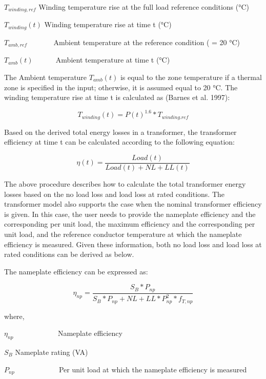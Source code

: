 \({T_{winding,ref}}\) Winding temperature rise at the full load reference conditions (°C)

\({T_{winding}}(t)\) Winding temperature rise at time t (°C)

\({T_{amb,ref}}\) ~~~~~~ Ambient temperature at the reference condition ( = 20 °C)

\({T_{amb}}(t)\) ~~~~~ Ambient temperature at time t (°C)

The Ambient temperature \({T_{amb}}(t)\) is equal to the zone temperature if a thermal zone is specified in the input; otherwise, it is assumed equal to 20 °C. The winding temperature rise at time t is calculated as (Barnes et al. 1997):

\begin{equation}
{T_{winding}}(t) = P{(t)^{1.6}}*{T_{winding.ref}}
\end{equation}

Based on the derived total energy losses in a transformer, the transformer efficiency at time t can be calculated according to the following equation:

\begin{equation}
\eta (t) = \frac{{Load(t)}}{{Load(t) + NL + LL(t)}}
\end{equation}

The above procedure describes how to calculate the total transformer energy losses based on the no load loss and load loss at rated conditions. The transformer model also supports the case when the nominal transformer efficiency is given. In this case, the user needs to provide the nameplate efficiency and the corresponding per unit load, the maximum efficiency and the corresponding per unit load, and the reference conductor temperature at which the nameplate efficiency is measured. Given these information, both no load loss and load loss at rated conditions can be derived as below.

The nameplate efficiency can be expressed as:

\begin{equation}
{\eta_{np}} = \frac{{{S_B}*{P_{np}}}}{{{S_B}*{P_{np}} + NL + LL*P_{np}^2*{f_{T,np}}}}
\end{equation}

where,

\({\eta_{np}}\) ~~~~~~~~~~~ Nameplate efficiency

\({S_B}\) Nameplate rating (VA)

\({P_{np}}\) ~~~~~~~~~~~ Per unit load at which the nameplate efficiency is measured

